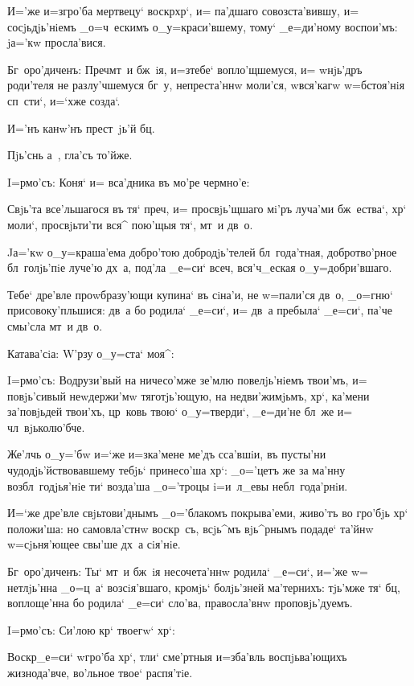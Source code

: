 И='же и=з\ъ гро'ба мертвецу` воскр хр`, и= 
па'дшаго совозста'вившу, и= сосjьдjь'нiемъ _о=ч~ескимъ 
о_у=краси'вшему, тому` _е=ди'ному воспои'мъ: jа='кw 
просла'вися.

Бг~оро'диченъ: Преч мт~и бж~iя, и=з\ъ тебе` 
вопло'щшемуся, и= w\т нjь'дръ роди'теля не разлу'чшемуся 
бг~у, непреста'ннw моли'ся, w\т вся'кагw w=бстоя'нiя 
сп~сти`, и=`хже созда`.

И='нъ канw'нъ прест~jь'й бц.

Пjь'снь а~, гла'съ то'йже.

I=рмо'съ: Коня` и= вса'дника въ мо'ре чермно'е:

Свjь'та все'льшагося въ тя` преч, и= 
просвjь'щшаго мi'ръ луча'ми бж~ества`, хр` моли`, 
просвjьти'ти вся^ пою'щыя тя`, мт~и дв~о.

Jа='кw о_у=краша'ема добро'тою добродjь'телей 
бл~года'тная, добротво'рное бл~голjь'пiе луче'ю дх~а, 
под'ла _е=си` всеч, вся'ч_еская о_у=добри'вшаго.

Тебе` дре'вле проwбразу'ющи купина` въ сiна'и, не 
w=пали'ся дв~о, _о=гню` присовоку'пльшися: дв~а бо 
родила` _е=си`, и= дв~а пребыла` _е=си`, па'че смы'сла 
мт~и дв~о.

Катава'сiа: W'рзу о_у=ста` моя^:


I=рмо'съ: Водрузи'вый на ничесо'мже зе'млю 
повелjь'нiемъ твои'мъ, и= повjь'сивый неwдержи'мw 
тяготjь'ющую, на недви'жимjьмъ, хр`, ка'мени 
за'повjьдей твои'хъ, цр~ковь твою` о_у=тверди`, _е=ди'не 
бл~же и= чл~вjьколю'бче.

Же'лчь о_у='бw и=`же и=з\ъ ка'мене ме'дъ сса'вшiи, въ 
пусты'ни чудодjь'йствовавшему тебjь` принесо'ша хр`: 
_о='цетъ же за ма'нну воз\ъ бл~годjья'нiе ти` возда'ша 
_о='троцы i=и~л_евы небл~года'рнiи.

И=`же дре'вле свjьтови'днымъ _о='блакомъ покрыва'еми, 
живо'тъ во гро'бjь хр` положи'ша: но самовла'стнw 
воскр~съ, всjь^мъ вjь^рнымъ подаде` та'йнw w=сjьня'ющее 
свы'ше дх~а сiя'нiе.

Бг~оро'диченъ: Ты` мт~и бж~iя несочета'ннw родила` 
_е=си`, и='же w= нетлjь'нна _о=ц~а` возсiя'вшаго, кромjь` 
болjь'зней ма'тернихъ: тjь'мже тя` бц, воплоще'нна бо 
родила` _е=си` сло'ва, правосла'внw проповjь'дуемъ. 

 I=рмо'съ: Си'лою кр` твоегw` хр`:

Воскр _е=си` w\т гро'ба хр`, тли` сме'ртныя 
и=зба'вль воспjьва'ющихъ жизнода'вче, во'льное твое` 
распя'тiе.


